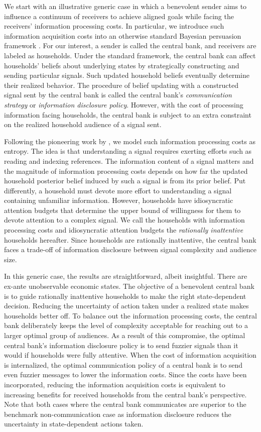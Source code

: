 \documentclass[12pt,a4paper]{article}
\begin{document}
We start with an illustrative generic case in which a benevolent sender aims to influence a continuum of receivers to achieve aligned goals while facing the receivers' information processing costs. In particular, we introduce such information acquisition costs into an otherwise standard Bayesian persuasion framework \citep{KG2011}. For our interest, a sender is called the central bank, and receivers are labeled as households. Under the standard framework, the central bank can affect households' beliefs about underlying states by strategically constructing and sending particular signals. Such updated household beliefs eventually determine their realized behavior. The procedure of belief updating with a constructed signal sent by the central bank is called the central bank's \textit{communication strategy} or \textit{information disclosure policy}. However, with the cost of processing information facing households, the central bank is subject to an extra constraint on the realized household audience of a signal sent. 

Following the pioneering work by \cite{Sims2003}, we model such information processing costs as entropy. The idea is that understanding a signal requires exerting efforts such as reading and indexing references. The information content of a signal matters and the magnitude of information processing costs depends on how far the updated household posterior belief induced by such a signal is from its prior belief. Put differently, a household must devote more effort to understanding a signal containing unfamiliar information. However, households have idiosyncratic attention budgets that determine the upper bound of willingness for them to devote attention to a complex signal. We call the households with information processing costs and idiosyncratic attention budgets the \textit{rationally inattentive} households hereafter. Since households are rationally inattentive, the central bank faces a trade-off of information disclosure between signal complexity and audience size.

In this generic case, the results are straightforward, albeit insightful. There are ex-ante unobservable economic states. The objective of a benevolent central bank is to guide rationally inattentive households to make the right state-dependent decision. Reducing the uncertainty of action taken under a realized state makes households better off. To balance out the information processing costs, the central bank deliberately keeps the level of complexity acceptable for reaching out to a larger optimal group of audiences. As a result of this compromise, the optimal central bank's information disclosure policy is to send fuzzier signals than it would if households were fully attentive. When the cost of information acquisition is internalized, the optimal communication policy of a central bank is to send even fuzzier messages to lower the information costs. Since the costs have been incorporated, reducing the information acquisition costs is equivalent to increasing benefits for received households from the central bank's perspective. Note that both cases where the central bank communicates are superior to the benchmark non-communication case as information disclosure reduces the uncertainty in state-dependent actions taken.
\end{document}
